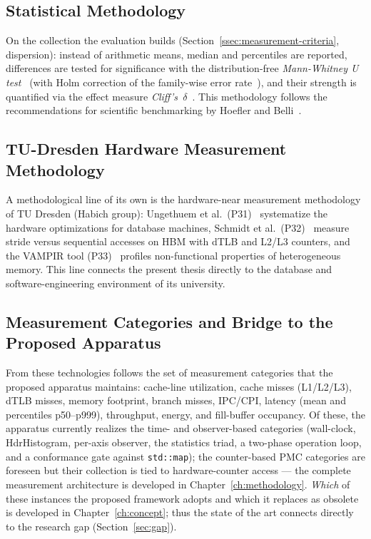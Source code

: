 \subsection{Statistical Methodology}\label{ssec:sota-meas-stats}
On the collection the evaluation builds (Section~\ref{ssec:measurement-criteria}, dispersion):
instead of arithmetic means, median and percentiles are reported, differences are tested for
significance with the distribution-free \emph{Mann-Whitney U test}~\cite{mann1947utest} (with Holm
correction of the family-wise error rate~\cite{holm1979sequential}), and their strength is
quantified via the effect measure \emph{Cliff's~$\delta$}~\cite{cliff1993dominance}. This
methodology follows the recommendations for scientific benchmarking by Hoefler and
Belli~\cite{hoefler2015benchmarking}.

\subsection{TU-Dresden Hardware Measurement Methodology}\label{ssec:sota-meas-tud}
A methodological line of its own is the hardware-near measurement methodology of TU Dresden (Habich
group): Ungethuem et al.\ (P31)~\cite{ungethuem2017survey} systematize the hardware optimizations
for database machines, Schmidt et al.\ (P32)~\cite{schmidt2025hbm} measure stride versus sequential
accesses on HBM with dTLB and L2/L3 counters, and the VAMPIR tool (P33)~\cite{berthold2023vampir}
profiles non-functional properties of heterogeneous memory. This line connects the present thesis
directly to the database and software-engineering environment of its university.

\subsection{Measurement Categories and Bridge to the Proposed Apparatus}\label{ssec:sota-meas-bridge}
From these technologies follows the set of measurement categories that the proposed apparatus
maintains: cache-line utilization, cache misses (L1/L2/L3), dTLB misses, memory footprint, branch
misses, IPC/CPI, latency (mean and percentiles p50--p999), throughput, energy, and fill-buffer
occupancy. Of these, the apparatus currently realizes the time- and observer-based categories
(wall-clock, HdrHistogram, per-axis observer, the statistics triad, a two-phase operation loop, and
a conformance gate against \texttt{std::map}); the counter-based PMC categories are foreseen but
their collection is tied to hardware-counter access --- the complete measurement architecture is
developed in Chapter~\ref{ch:methodology}\@. \emph{Which} of these instances the proposed framework
adopts and which it replaces as obsolete is developed in Chapter~\ref{ch:concept}; thus the state of
the art connects directly to the research gap (Section~\ref{sec:gap}).

